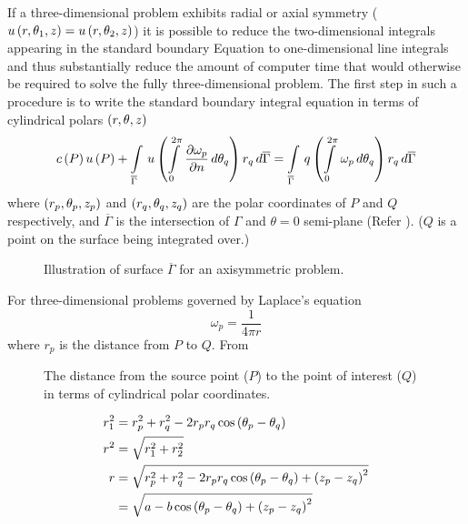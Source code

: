 If a three-dimensional problem exhibits radial or axial symmetry (\ie
$ u\left( r,\theta_{1},z \right) = u\left( r,\theta_{2},z \right) $) it is possible to reduce the
two-dimensional integrals appearing in the standard boundary Equation to
one-dimensional line integrals and thus substantially reduce the amount of
computer time that would otherwise be required to solve the fully
three-dimensional problem. The first step in such a procedure is to write the
standard boundary integral equation in terms of cylindrical polars
$\left( r,\theta,z \right)$ \ie
\begin{equation}
   c\left( P \right)   u\left( P \right)  +
    \displaystyle\int\limits_{\overline{\Gamma}}^{} \,u\left(   \displaystyle\int\limits_{0}^{2\pi} \, \dfrac{\partial \omega_{p}}{\partial n} \,d\theta_{q}  \right)r_{q}\,d\overline{\Gamma}  =
      \displaystyle\int\limits_{\overline{\Gamma}}^{} \,q \left(   \displaystyle\int\limits_{0}^{2 \pi} \,\omega_{p}\,d\theta_{q}  \right) r_{q}\,d\overline{\Gamma} 
  \label{eqn:BoInteq}
\end{equation}
where $\left( r_{p},\theta_{p},z_{p} \right)$ and $\left( r_{q}, \theta_{q}, z_{q} \right)$ are the
polar coordinates of $P$ and $Q$ respectively, and $\overline{\Gamma}$ is the
intersection of $\Gamma$ and $\theta=0$ semi-plane (Refer
). (\nb $Q$ is a point on the surface being integrated
over.)
\begin{figure} \centering
 
 \caption{Illustration of surface $\overline{\Gamma}$ for an 
  axisymmetric problem.}
\label{fig:cylinder}
\end{figure}

For three-dimensional problems governed by Laplace's equation
\begin{equation*}
  \omega_{p} = \dfrac{1}{4 \pi r}
\end{equation*}
where $r_{p}$ is the distance from $P$ to $Q$. From 
\begin{figure} \centering
  
  \caption{The distance from the source point ($P$) to the point of 
   interest ($Q$) in terms of cylindrical polar coordinates.}
 \label{fig:rdiag}
\end{figure}
\begin{align}
  r_{1}^{2} &= r_{p}^{2} + r_{q}^{2} -2r_{p}r_{q}\cos\left( \theta_{p}-
  \theta_{q} \right) \nonumber \\ 
  r^{2} &= \sqrt{r_{1}^{2} + r_{2}^{2}} \nonumber \\ 
  r &= \sqrt{r_{p}^{2} + r_{q}^{2}-2r_{p}r_{q}\cos\left( \theta_{p}-\theta_{q} \right)+
    \left( z_{p}-z_{q} \right)^2} \nonumber \\
  &= \sqrt{a-b \cos\left( \theta_{p}-\theta_{q} \right)+\left( z_{p}-z_{q} \right)^2}
  \label{eqn:diageq}
\end{align}

